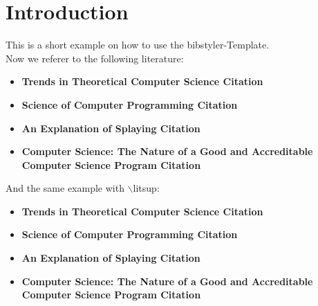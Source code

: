 \documentclass[a4paper,12pt]{scrartcl}
\newcommand\lit[1]{Citation \cite{#1}}
\newcommand\litsup[1]{Citation \supercite{#1}}
\begin{document}
\tableofcontents
\newpage

\section{Introduction}
This is a short example on how to use the bibstyler-Template. \\
Now we referer to the following literature:

\begin{itemize}
 \item{\bf Trends in Theoretical Computer Science \lit{boerger_trends83}}
 \item{\bf Science of Computer Programming \lit{SCP}}
 \item{\bf An Explanation of Splaying \lit{Subramanian:1994:ES}}
 \item{\bf Computer Science: The Nature of a Good and Accreditable Computer Science Program \lit{Martin96}}
\end{itemize}

And the same example with $\backslash$litsup:

\begin{itemize}
 \item{\bf Trends in Theoretical Computer Science \litsup{boerger_trends83}}
 \item{\bf Science of Computer Programming \litsup{SCP}}
 \item{\bf An Explanation of Splaying \litsup{Subramanian:1994:ES}}
 \item{\bf Computer Science: The Nature of a Good and Accreditable Computer Science Program \litsup{Martin96}}
\end{itemize}

\newpage

\newpage
{}
{}
\printbibliography[maxnames=99]
\end{document}
